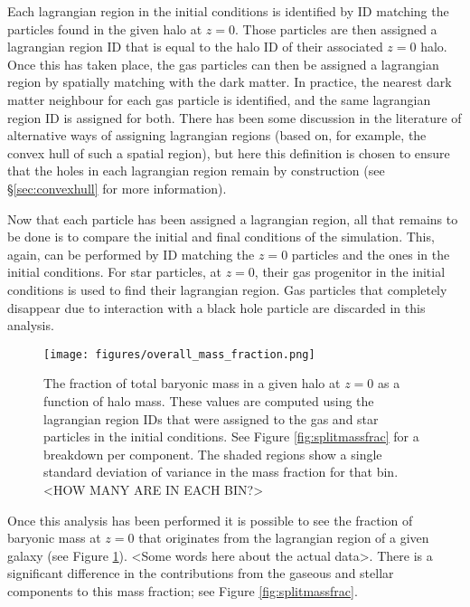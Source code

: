 Each lagrangian region in the initial conditions is identified by ID matching the particles found in the given halo at $z=0$. Those particles are then assigned a lagrangian region ID that is equal to the halo ID of their associated $z=0$ halo. Once this has taken place, the gas particles can then be assigned a lagrangian region by spatially matching with the dark matter. In practice, the nearest dark matter neighbour for each gas particle is identified, and the same lagrangian region ID is assigned for both. There has been some discussion in the literature of alternative ways of assigning lagrangian regions (based on, for example, the convex hull of such a spatial region), but here this definition is chosen to ensure that the holes in each lagrangian region remain by construction (see \S \ref{sec:convexhull} for more information).

Now that each particle has been assigned a lagrangian region, all that remains to be done is to compare the initial and final conditions of the simulation. This, again, can be performed by ID matching the $z=0$ particles and the ones in the initial conditions. For star particles, at $z=0$, their gas progenitor in the initial conditions is used to find their lagrangian region. Gas particles that completely disappear due to interaction with a black hole particle are discarded in this analysis.

\begin{figure}
    \centering
    \texttt{[image: figures/overall\_mass\_fraction.png]}
    \caption{The fraction of total baryonic mass in a given halo at $z=0$ as a function of halo mass. These values are computed using the lagrangian region IDs that were assigned to the gas and star particles in the initial conditions. See Figure \ref{fig:splitmassfrac} for a breakdown per component. The shaded regions show a single standard deviation of variance in the mass fraction for that bin. <HOW MANY ARE IN EACH BIN?>}
    \label{fig:massfrac}
\end{figure}

Once this analysis has been performed it is possible to see the fraction of baryonic mass at $z=0$ that originates from the lagrangian region of a given galaxy (see Figure \ref{fig:massfrac}). <Some words here about the actual data>. There is a significant difference in the contributions from the gaseous and stellar components to this mass fraction; see Figure \ref{fig:splitmassfrac}.

